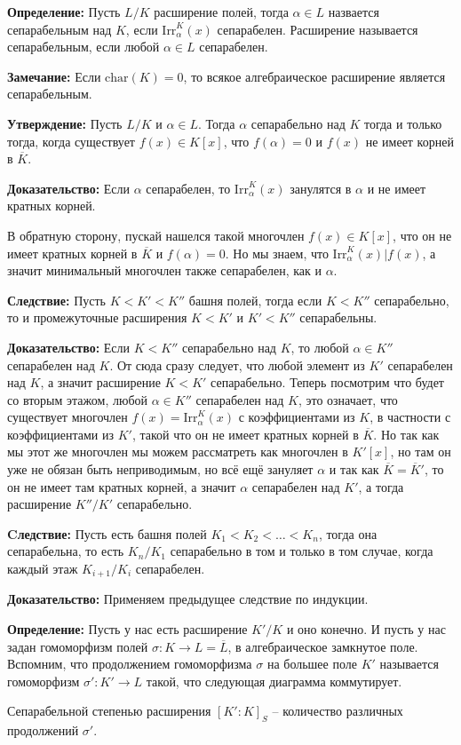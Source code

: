 \documentclass[a4paper, 12pt]{book}
\begin{document}
\textbf{Определение:} Пусть $L/K$ расширение полей, тогда $\alpha\in L$ назвается
сепарабельным над $K$, если $\text{Irr}_\alpha^K(x)$ сепарабелен. Расширение
называется сепарабельным, если любой $\alpha\in L$ сепарабелен.

\textbf{Замечание:} Если $\text{char}(K)=0$, то всякое алгебраическое расширение
является сепарабельным.

\textbf{Утверждение:} Пусть $L/K$ и $\alpha\in L$. Тогда $\alpha$ сепарабельно
над $K$ тогда и только тогда, когда существует $f(x)\in K[x]$, что $f(\alpha)=0$
и $f(x)$ не имеет корней в $\overline{K}$.

\textbf{Доказательство:} Если $\alpha$ сепарабелен, то $\text{Irr}_\alpha^K(x)$
занулятся в $\alpha$ и не имеет кратных корней.

В обратную сторону, пускай нашелся такой многочлен $f(x)\in K[x]$, что он не
имеет кратных корней в $\overline K$ и $f(\alpha)=0$. Но мы знаем, что
$\text{Irr}_\alpha^K(x)|f(x)$, а значит минимальный многочлен также сепарабелен,
как и $\alpha$.

\textbf{Следствие:} Пусть $K<K'<K''$ башня полей, тогда если $K<K''$
сепарабельно, то и промежуточные расширения $K<K'$ и $K'<K''$ сепарабельны.

\textbf{Доказательство:} Если $K<K''$ сепарабельно над $K$, то любой $\alpha\in
K''$ сепарабелен над $K$. От сюда сразу следует, что любой элемент из $K'$
сепарабелен над $K$, а значит расширение $K<K'$ сепарабельно. Теперь посмотрим
что будет со вторым этажом, любой $\alpha\in K''$ сепарабелен над $K$, это
означает, что существует многочлен $f(x)=\text{Irr}_\alpha^K(x)$ с коэффициентами из $K$, в частности
с коэффициентами из $K'$, такой что он не имеет кратных корней в $\overline{K}$.
Но так как мы этот же многочлен мы можем рассматреть как многочлен в $K'[x]$,
но там он уже не обязан быть неприводимым, но всё ещё зануляет $\alpha$ и
так как $\overline K = \overline K'$, то он не имеет там кратных корней, а значит
$\alpha$ сепарабелен над $K'$, а тогда расширение $K''/K'$ сепарабельно.

\textbf{Cледствие:} Пусть есть башня полей $K_1<K_2<\ldots<K_n$, тогда она
сепарабельна, то есть $K_n/K_1$ сепарабельно в том и только в том случае,
когда каждый этаж $K_{i+1}/K_i$ сепарабелен.

\textbf{Доказательство:} Применяем предыдущее следствие по индукции.

\textbf{Определение:} Пусть у нас есть расширение $K'/K$ и оно конечно. И пусть
у нас задан гомоморфизм полей $\sigma:K\rightarrow L=\overline L$, в
алгебраическое замкнутое поле. Вспомним, что продолжением гомоморфизма $\sigma$
на большее поле $K'$ называется гомоморфизм $\sigma':K'\rightarrow L$ такой,
что следующая диаграмма коммутирует.
\begin{center}
\end{center}
Сепарабельной степенью расширения $[K':K]_S$ – количество различных продолжений
$\sigma'$.
\end{document}
